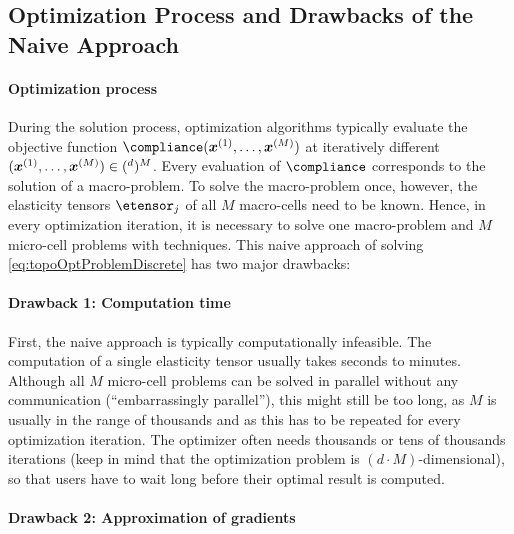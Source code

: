 \subsection{Optimization Process and Drawbacks of the Naive Approach}
\label{sec:613optimization}

\paragraph{Optimization process}

During the solution process, optimization algorithms typically
evaluate the objective function $\compliance(\*x^{(1)}, \dotsc, \*x^{(M)})$
at iteratively different 
$(\*x^{(1)}, \dotsc, \*x^{(M)}) \in (\real^d)^M$.
Every evaluation of $\compliance$ corresponds to the solution of a
macro-problem.
To solve the macro-problem once, however, the elasticity tensors
$\etensor_j$ of all $M$ macro-cells need to be known.
Hence, in every optimization iteration, it is necessary to solve
one macro-problem and $M$ micro-cell problems with \fem techniques.
This naive approach of solving \eqref{eq:topoOptProblemDiscrete}
has two major drawbacks:

\paragraph{Drawback 1: Computation time}

First, the naive approach is typically computationally infeasible.
The computation of a single elasticity tensor usually takes seconds to
minutes.
Although all $M$ micro-cell problems can be solved in parallel without any
communication (``embarrassingly parallel''), this might still be too long,
as $M$ is usually in the range of thousands and
as this has to be repeated for every optimization iteration.
The optimizer often needs thousands or tens of thousands iterations
(keep in mind that the optimization problem is $(d \cdot M)$-dimensional),
so that users have to wait long before their optimal result is computed.

\paragraph{Drawback 2: Approximation of gradients}


